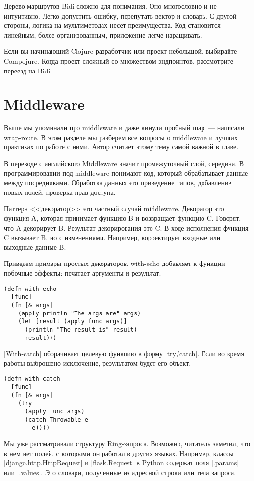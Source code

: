 Дерево маршрутов Bidi сложно для понимания. Оно многословно и не
интуитивно. Легко допустить ошибку, перепутать вектор и словарь. С другой
стороны, логика на мультиметодах несет преимущества. Код становится линейным,
более организованным, приложение легче наращивать.

Если вы начинающий Clojure-разработчик или проект небольшой, выбирайте
Compojure. Когда проект сложный со множеством эндпоинтов, рассмотрите переезд на
Bidi.

\section{Middleware}

Выше мы упоминали про middleware и даже кинули пробный шар~--- написали
wrap-route. В этом разделе мы разберем все вопросы о middleware и лучших
практиках по работе с ними. Автор считает этому тему самой важной в главе.

В переводе с английского Middleware значит промежуточный слой, середина. В
программировании под middleware понимают код, который обрабатывает данные между
посредниками. Обработка данных это приведение типов, добавление новых полей,
проверка прав доступа.

Паттерн <<декоратор>> это частный случай middleware. Декоратор это функция А,
которая принимает функцию B и возвращает функцию C. Говорят, что A декорирует
B. Результат декорирования это C. В ходе исполнения функция C вызывает B, но с
изменениями. Например, корректирует входные или выходные данные B.

Приведем примеры простых декораторов. with-echo добавляет к функции побочные
эффекты: печатает аргументы и результат.

\begin{verbatim}
(defn with-echo
  [func]
  (fn [& args]
    (apply println "The args are" args)
    (let [result (apply func args)]
      (println "The result is" result)
      result)))
\end{verbatim}

\spverb|With-catch| оборачивает целевую функцию в форму \spverb|try/catch|. Если во время
работы выброшено исключение, результатом будет его объект.

\begin{verbatim}
(defn with-catch
  [func]
  (fn [& args]
    (try
      (apply func args)
      (catch Throwable e
        e))))
\end{verbatim}

Мы уже рассматривали структуру Ring-запроса. Возможно, читатель заметил, что в
нем нет полей, с которыми он работал в других языках. Например, классы
\spverb|django.http.HttpRequest| и \spverb|flask.Request| в Python содержат поля \spverb|.params| или
\spverb|.values|. Это словари, полученные из адресной строки или тела запроса.

